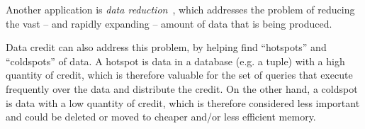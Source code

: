 Another application is \emph{data reduction}~\cite{milo2019getting}, which addresses the problem of reducing the vast -- and rapidly expanding -- amount of data that is being produced. %

Data credit can also address this problem, by helping find ``hotspots'' and ``coldspots'' of data. A hotspot is data in a database (e.g. a tuple) with a high quantity of credit, which is therefore valuable for the set of queries that execute frequently over the data and distribute the credit. 
On the other hand, a coldspot is data with a low quantity of credit, which is therefore  considered less  important and could be deleted or moved to cheaper and/or less efficient memory. 
